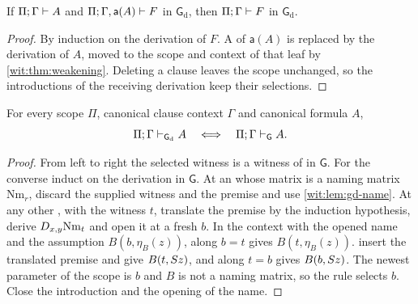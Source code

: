 \begin{corollary}
\label{wit:cor:gd-cut}
If $\Pi;\Gamma\vdash A$ and $\Pi;\Gamma,\mathsf{a}(A)\vdash F$ in
$\mathsf{G}_{\mathrm d}$, then $\Pi;\Gamma\vdash F$ in
$\mathsf{G}_{\mathrm d}$.
\end{corollary}

\begin{proof}
By induction on the derivation of $F$.  A  of
$\mathsf{a}(A)$ is replaced by the derivation of $A$, moved to the scope and
context of that leaf by \cref{wit:thm:weakening}.  Deleting a clause leaves
the scope unchanged, so the introductions of the receiving derivation keep
their selections.
\end{proof}

\begin{theorem}
\label{wit:thm:gd}
For every scope $\Pi$, canonical clause context $\Gamma$ and canonical
formula $A$,
\[
 \Pi;\Gamma\vdash_{\mathsf{G}_{\mathrm d}}A
 \quad\Longleftrightarrow\quad
 \Pi;\Gamma\vdash_{\mathsf{G}}A .
\]
\end{theorem}

\begin{proof}
From left to right the selected witness is a witness of  in
$\mathsf{G}$.  For the converse induct on the derivation in $\mathsf{G}$.
At an  whose matrix is a naming matrix $\mathrm{Nm}_r$,
discard the supplied witness and the premise and use
\cref{wit:lem:gd-name}.  At any other , with the witness
$t$, translate the premise by the induction hypothesis, derive
$D_{x,y}\mathrm{Nm}_t$ and open it at a fresh $b$.  In the context with the
opened name and the assumption $B(b,\eta_B(z))$,  along $b=t$
gives $B(t,\eta_B(z))$.   insert the
translated premise and give $B(t,S z)$, and  along $t=b$
gives $B(b,S z)$.  The newest parameter of the scope is $b$ and $B$ is
not a naming matrix, so the rule selects $b$.  Close the introduction and
the opening of the name.
\end{proof}

